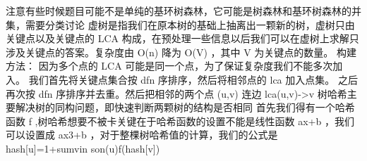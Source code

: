 {}注意有些时候题目可能不是单纯的基环树森林，它可能是树森林和基环树森林的并集，需要分类讨论\markdownRendererInterblockSeparator
{}
\markdownRendererSectionEnd \markdownRendererSectionBegin
{}\markdownRendererInterblockSeparator
{}\markdownRendererInterblockSeparator
{}
\markdownRendererSectionEnd 
\markdownRendererSectionEnd \markdownRendererSectionBegin
{}\markdownRendererInterblockSeparator
{}虚树是指我们在原本树的基础上抽离出一颗新的树，虚树只由关键点以及关键点的\markdownRendererDollarSign{} LCA\markdownRendererSoftLineBreak
{}\markdownRendererDollarSign{}构成，在预处理一些信息以后我们可以在虚树上求解只涉及关键点的答案。复杂度由\markdownRendererDollarSign{} O(n) \markdownRendererDollarSign{}降为\markdownRendererDollarSign{} O(V) \markdownRendererDollarSign{}，其中\markdownRendererDollarSign{} V \markdownRendererDollarSign{}为关键点的数量。\markdownRendererParagraphSeparator
{}构建方法：\markdownRendererParagraphSeparator
{}因为多个点的\markdownRendererDollarSign{} LCA \markdownRendererDollarSign{}可能是同一个点，为了保证复杂度我们不能多次加入。\markdownRendererParagraphSeparator
{}我们首先将关键点集合按\markdownRendererDollarSign{} dfn \markdownRendererDollarSign{}序排序，然后将相邻点的\markdownRendererDollarSign{} lca \markdownRendererDollarSign{}加入点集。\markdownRendererParagraphSeparator
{}之后再次按\markdownRendererDollarSign{} dfn \markdownRendererDollarSign{}序排序并去重。然后把相邻的两个点\markdownRendererDollarSign{} (u,v) \markdownRendererDollarSign{}连边\markdownRendererDollarSign{} lca(u,v)->v \markdownRendererDollarSign{}\markdownRendererInterblockSeparator
{}\markdownRendererInterblockSeparator
{}
\markdownRendererSectionEnd \markdownRendererSectionBegin
{}\markdownRendererInterblockSeparator
{}树哈希主要解决树的同构问题，即快速判断两颗树的结构是否相同\markdownRendererParagraphSeparator
{}首先我们得有一个哈希函数\markdownRendererDollarSign{} f \markdownRendererDollarSign{},树哈希想要不被卡关键在于哈希函数的设置不能是线性函数\markdownRendererDollarSign{} ax+b\markdownRendererSoftLineBreak
{}\markdownRendererDollarSign{}，我们可以设置成\markdownRendererDollarSign{} ax\markdownRendererCircumflex{}3+b \markdownRendererDollarSign{}，对于整棵树哈希值的计算，我们的公式是\markdownRendererDollarSign{} hash[u]=1+\markdownRendererBackslash{}sum\markdownRendererUnderscore{}\markdownRendererLeftBrace{}v\markdownRendererBackslash{}in son(u)\markdownRendererRightBrace{}f(hash[v]) \markdownRendererDollarSign{}\markdownRendererParagraphSeparator
